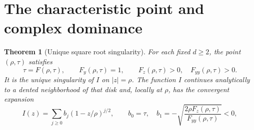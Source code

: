\documentclass[11pt]{article}
\newtheorem{theorem}{Theorem}[section]
\theoremstyle{definition}\newtheorem{definition}[theorem]{Definition}
\theoremstyle{remark}\newtheorem{remark}[theorem]{Remark}
\begin{document}
\section{The characteristic point and complex dominance}
\label{bit:sec:dominance}
\begin{theorem}[Unique square root singularity]
\label{bit:thm:sqrt}
For each fixed $d\ge2$, the point $(\rho,\tau)$ satisfies
\begin{equation}
 \tau=F(\rho,\tau),\qquad F_y(\rho,\tau)=1,
 \qquad F_z(\rho,\tau)>0,\quad F_{yy}(\rho,\tau)>0.
 \label{bit:eq:critical}
\end{equation}
It is the unique singularity of $I$ on $|z|=\rho$. The function $I$ continues analytically to a dented neighborhood of that disk and, locally at $\rho$, has the convergent expansion
\begin{equation}
 I(z)=\sum_{j\ge0}b_j(1-z/\rho)^{j/2},\qquad
 b_0=\tau,\quad b_1=-\sqrt{\frac{2\rho F_z(\rho,\tau)}{F_{yy}(\rho,\tau)}}<0,
 \label{bit:eq:puiseux}
\end{equation}
\end{theorem}
\end{document}
